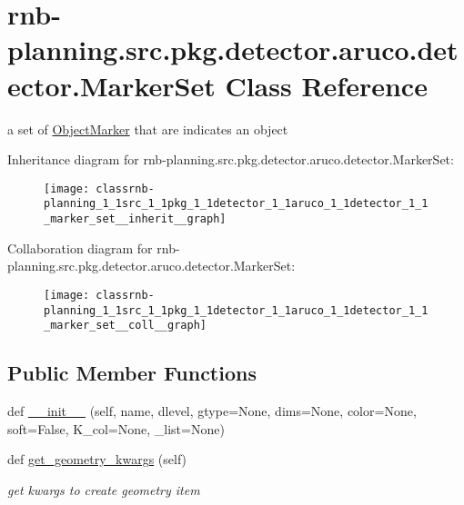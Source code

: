 \hypertarget{classrnb-planning_1_1src_1_1pkg_1_1detector_1_1aruco_1_1detector_1_1_marker_set}{}\section{rnb-\/planning.src.\+pkg.\+detector.\+aruco.\+detector.\+Marker\+Set Class Reference}
\label{classrnb-planning_1_1src_1_1pkg_1_1detector_1_1aruco_1_1detector_1_1_marker_set}


a set of \hyperlink{classrnb-planning_1_1src_1_1pkg_1_1detector_1_1aruco_1_1detector_1_1_object_marker}{Object\+Marker} that are indicates an object  




Inheritance diagram for rnb-\/planning.src.\+pkg.\+detector.\+aruco.\+detector.\+Marker\+Set\+:\nopagebreak
\begin{figure}[H]
\begin{center}
\leavevmode
\texttt{[image: classrnb-planning\_1\_1src\_1\_1pkg\_1\_1detector\_1\_1aruco\_1\_1detector\_1\_1\_marker\_set\_\_inherit\_\_graph]}
\end{center}
\end{figure}


Collaboration diagram for rnb-\/planning.src.\+pkg.\+detector.\+aruco.\+detector.\+Marker\+Set\+:\nopagebreak
\begin{figure}[H]
\begin{center}
\leavevmode
\texttt{[image: classrnb-planning\_1\_1src\_1\_1pkg\_1\_1detector\_1\_1aruco\_1\_1detector\_1\_1\_marker\_set\_\_coll\_\_graph]}
\end{center}
\end{figure}
\subsection*{Public Member Functions}
\begin{DoxyCompactItemize}
\item 
def \hyperlink{classrnb-planning_1_1src_1_1pkg_1_1detector_1_1aruco_1_1detector_1_1_marker_set_a3bb2d3e4aa94e636f5ea646a2f9ea3b2}{\+\_\+\+\_\+init\+\_\+\+\_\+} (self, name, dlevel, gtype=None, dims=None, color=None, soft=False, K\+\_\+col=None, \+\_\+list=None)
\item 
\mbox{\label{classrnb-planning_1_1src_1_1pkg_1_1detector_1_1aruco_1_1detector_1_1_marker_set_ab585d9a216fd9ba17a4d5b35e8eb8f8d}} 
def \hyperlink{classrnb-planning_1_1src_1_1pkg_1_1detector_1_1aruco_1_1detector_1_1_marker_set_ab585d9a216fd9ba17a4d5b35e8eb8f8d}{get\+\_\+geometry\+\_\+kwargs} (self)
\begin{DoxyCompactList}\small\item\em get kwargs to create geometry item \end{DoxyCompactList}\end{DoxyCompactItemize}
